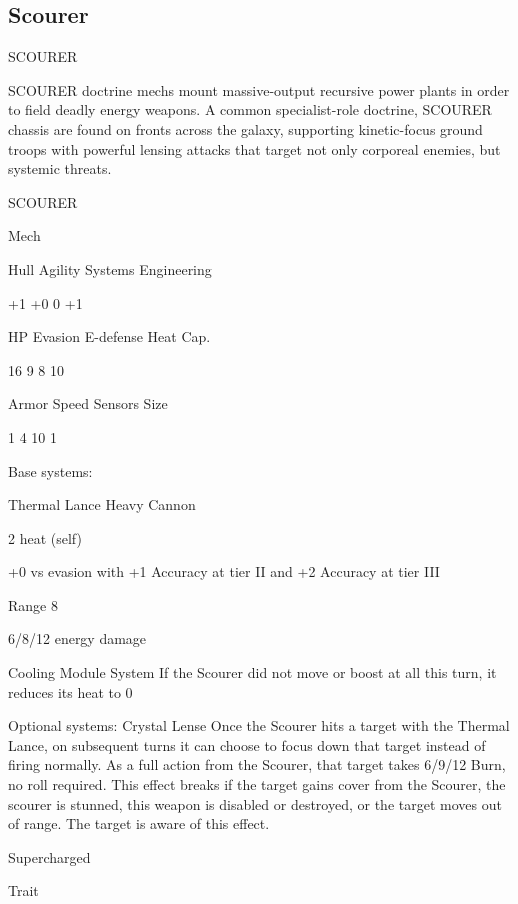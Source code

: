 \subsection{Scourer}

                                              SCOURER  

SCOURER doctrine mechs mount massive-output recursive power plants in order to field deadly  
energy weapons. A common specialist-role doctrine, SCOURER chassis are found on fronts  
across the galaxy, supporting kinetic-focus ground troops with powerful lensing attacks that  
target not only corporeal enemies, but systemic threats. 
 

 SCOURER 

 Mech 

 Hull       Agility     Systems       Engineering 

 +1         +0           0            +1 

 HP         Evasion      E-defense    Heat Cap. 

 16         9            8            10 

 Armor      Speed       Sensors       Size 

 1          4            10           1 

Base systems:
 
Thermal Lance  
Heavy Cannon
 
2 heat (self)
 
+0 vs evasion with +1 Accuracy at tier II and +2 Accuracy at tier III
 
Range 8
 
6/8/12 energy damage
 

Cooling Module  
System  
If the Scourer did not move or boost at all this turn, it reduces its heat to 0
 

Optional systems:  
Crystal Lense  
Once the Scourer hits a target with the Thermal Lance, on subsequent turns it can choose to  
focus down that target instead of firing normally. As a full action from the Scourer, that target  
takes 6/9/12 Burn, no roll required. This effect breaks if the target gains cover from the Scourer,  
the scourer is stunned, this weapon is disabled or destroyed, or the target moves out of range.  
The target is aware of this effect.
 

Supercharged
 
Trait
 

                                                                                                         


